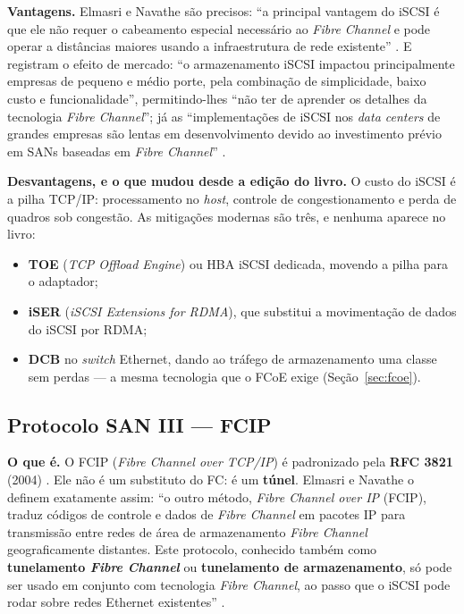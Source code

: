 \documentclass[11pt,a4paper]{article}
\begin{document}
\textbf{Vantagens.} Elmasri e Navathe são precisos: ``a principal vantagem do iSCSI é que ele não
requer o cabeamento especial necessário ao \textit{Fibre Channel} e pode operar a distâncias
maiores usando a infraestrutura de rede existente'' \cite{elmasri2018}. E registram o efeito de
mercado: ``o armazenamento iSCSI impactou principalmente empresas de pequeno e médio porte, pela
combinação de simplicidade, baixo custo e funcionalidade'', permitindo-lhes ``não ter de aprender
os detalhes da tecnologia \textit{Fibre Channel}''; já as ``implementações de iSCSI nos
\textit{data centers} de grandes empresas são lentas em desenvolvimento devido ao investimento
prévio em SANs baseadas em \textit{Fibre Channel}'' \cite{elmasri2018}.

\textbf{Desvantagens, e o que mudou desde a edição do livro.} O custo do iSCSI é a pilha TCP/IP:
processamento no \textit{host}, controle de congestionamento e perda de quadros sob congestão. As
mitigações modernas são três, e nenhuma aparece no livro:
\begin{itemize}[leftmargin=0.7cm,itemsep=2pt]
\item \textbf{TOE} (\textit{TCP Offload Engine}) ou HBA iSCSI dedicada, movendo a pilha para o
      adaptador;
\item \textbf{iSER} (\textit{iSCSI Extensions for RDMA}), que substitui a movimentação de dados do
      iSCSI por RDMA;
\item \textbf{DCB} no \textit{switch} Ethernet, dando ao tráfego de armazenamento uma classe sem
      perdas --- a mesma tecnologia que o FCoE exige (Seção~\ref{sec:fcoe}).
\end{itemize}

\subsection{Protocolo SAN III --- FCIP}
\label{sec:fcip}

\textbf{O que é.} O FCIP (\textit{Fibre Channel over TCP/IP}) é padronizado pela \textbf{RFC 3821}
(2004) \cite{rfc3821}. Ele não é um substituto do FC: é um \textbf{túnel}. Elmasri e Navathe o
definem exatamente assim: ``o outro método, \textit{Fibre Channel over IP} (FCIP), traduz códigos de
controle e dados de \textit{Fibre Channel} em pacotes IP para transmissão entre redes de área de
armazenamento \textit{Fibre Channel} geograficamente distantes. Este protocolo, conhecido também
como \textbf{tunelamento \textit{Fibre Channel}} ou \textbf{tunelamento de armazenamento}, só pode
ser usado em conjunto com tecnologia \textit{Fibre Channel}, ao passo que o iSCSI pode rodar sobre
redes Ethernet existentes'' \cite{elmasri2018}.
\end{document}

